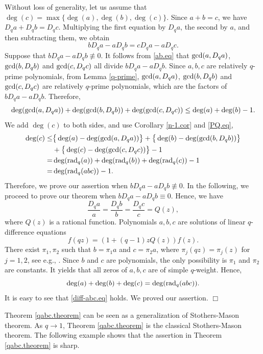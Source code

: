 \documentclass[a4paper,12pt]{article}
\newenvironment{proof}
{\noindent{\it Proof.}}{\hfill $\Box$\par\vspace{2.5mm}}
\numberwithin{equation}{section}
\begin{document}
\begin{proof}
Without loss of generality, let us assume that $\deg(c)=\max\{\deg(a),\deg(b),\deg(c)\}$.
Since $a+b=c$, we have $D_qa+D_qb=D_qc$. Multiplying
the first equation by $D_qa$, the second by $a$, and then subtracting them, we obtain
    \begin{equation}\label{ab.eq}
    bD_qa-aD_qb=cD_qa-aD_qc.
    \end{equation}
Suppose that $bD_qa-aD_qb\not\equiv 0$. It follows from \eqref{ab.eq} that
${\rm gcd}(a,D_qa)$, ${\rm gcd}(b,D_qb)$ and ${\rm gcd}(c,D_qc)$ all divide
$bD_qa-aD_qb$. Since $a,b,c$ are relatively $q$-prime polynomials, from Lemma \ref{q-prime}, ${\rm gcd}(a,D_qa)$, ${\rm gcd}(b,D_qb)$ and ${\rm gcd}(c,D_qc)$ are relatively $q$-prime polynomials, which are the factors of $bD_qa-aD_qb$. Therefore,
    $$
    \deg({\rm gcd}(a,D_qa))+\deg({\rm gcd}(b,D_qb))+\deg({\rm gcd}(c,D_qc))
    \leq \deg(a)+\deg(b)-1.
    $$
We add $\deg(c)$ to both sides, and use Corollary \ref{n-1.cor} and \eqref{PQ.eq},
    \begin{equation*}
    \begin{split}
    \deg(c)\leq& \big\{\deg(a)-\deg({\rm gcd}(a,D_qa))\big\}+\big\{\deg(b)-\deg({\rm gcd}(b,D_qb))\big\}\\
    &+\big\{\deg(c)-\deg({\rm gcd}(c,D_qc))\big\}-1\\
    =&\deg({\rm rad}_q(a))+\deg({\rm rad}_q(b))+\deg({\rm rad}_q(c))-1\\
    =&\deg({\rm rad}_q(abc))-1.
    \end{split}
    \end{equation*}
Therefore, we prove our assertion when $bD_qa-aD_qb\not\equiv 0$. In the following, we proceed to prove our theorem when $bD_qa-aD_qb\equiv 0$. Hence, we have
    $$
    \frac{D_qa}{a}=\frac{D_qb}{b}=\frac{D_qc}{c}=Q(z),
    $$
where $Q(z)$ is a rational function. Polynomials $a,b,c$ are solutions of linear $q$-difference equations
    $$
    f(qz)=(1+(q-1)zQ(z))f(z).
    $$
There exist $\pi_1,\pi_2$ such that $b=\pi_1a$ and $c=\pi_2a$, where $\pi_j(qz)=\pi_j(z)$ for $j=1,2$, see e.g., \cite{AAIM}. Since $b$ and $c$ are polynomials, the only possibility is $\pi_1$ and $\pi_2$ are constants. It yields that all zeros of $a,b,c$ are of simple $q$-weight. Hence,
    $$
    \deg(a)+\deg(b)+\deg(c)=\deg({\rm rad}_q(abc)).
    $$
It is easy to see that \eqref{diff-abc.eq} holds. We proved our assertion.
\end{proof}

Theorem \ref{qabc.theorem} can be seen as a generalization of Stothers-Mason theorem. As $q\to 1$,
Theorem \ref{qabc.theorem} is the classical Stothers-Mason theorem.
The following example shows that the assertion in Theorem \ref{qabc.theorem} is sharp.
\end{document}
